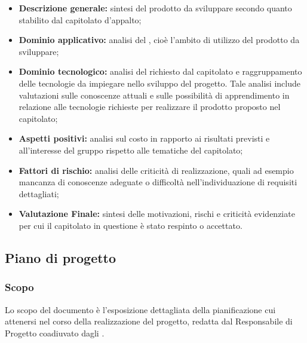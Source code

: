 \documentclass[../NormediProgetto.tex]{subfiles}
\begin{document}
\begin{itemize}
    \item \textbf{Descrizione generale:} sintesi del prodotto da sviluppare secondo quanto stabilito dal capitolato d'appalto;
    
    \item \textbf{Dominio applicativo:} analisi del , cioè l'ambito di utilizzo del prodotto da sviluppare;
    
    \item \textbf{Dominio tecnologico:} analisi del  richiesto dal capitolato e raggruppamento delle tecnologie da impiegare nello sviluppo del progetto. Tale analisi include valutazioni sulle conoscenze attuali e sulle possibilità di apprendimento in relazione alle tecnologie richieste per realizzare il prodotto proposto nel capitolato;
    
    \item \textbf{Aspetti positivi:} analisi sul costo in rapporto ai risultati previsti e all’interesse del gruppo rispetto alle tematiche del capitolato;
    
    \item \textbf{Fattori di rischio:} analisi delle criticità di realizzazione, quali ad esempio mancanza di conoscenze adeguate o difficoltà nell’individuazione di requisiti dettagliati;
    
    \item \textbf{Valutazione Finale:} sintesi delle motivazioni, rischi e criticità evidenziate per cui il capitolato in questione è stato respinto o accettato.
\end{itemize}


\subsection{Piano di progetto}

\subsubsection{Scopo}

Lo scopo del documento è l'esposizione dettagliata della pianificazione cui attenersi nel corso della realizzazione del progetto, redatta dal Responsabile di Progetto coadiuvato dagli . 
\end{document}
